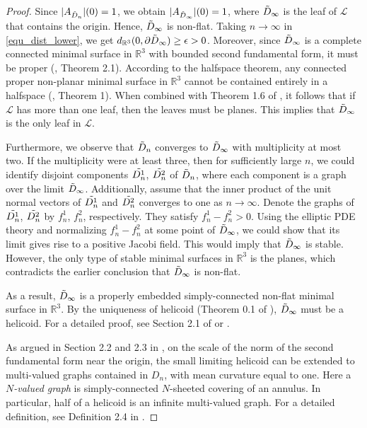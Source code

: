 \documentclass[12pt,a4paper]{amsart}
\numberwithin{equation}{section}
\theoremstyle{plain}
\theoremstyle{named}
\theoremstyle{definition}
\begin{document}
\begin{proof}
    Since $|A_{\Tilde{D}_n}|(0)=1$, we obtain $|A_{\Tilde{D}_\infty}|(0)=1$, where $\Tilde{D}_\infty$ is the leaf of $\mathcal{L}$ that contains the origin. Hence, $\Tilde{D}_\infty$ is non-flat. Taking $n\to\infty$ in \eqref{equ_dist_lower}, we get $d_{\mathbb{R}^3}(0,\partial\Tilde{D}_\infty)\geq \epsilon>0$.
    Moreover, since $\Tilde{D}_\infty$ is a complete connected minimal surface in $\mathbb{R}^3$ with bounded second fundamental form, it must be proper (\cite{Meeks-Rosenberg_properness}, Theorem 2.1).
    According to the halfspace theorem, any connected proper non-planar minimal surface in $\mathbb{R}^3$ cannot be contained entirely in a halfspace (\cite{Hoffman-Meeks}, Theorem 1). When combined with Theorem 1.6 of \cite{Meeks-Rosenberg}, it follows that if $\mathcal{L}$ has more than one leaf, then the leaves must be planes. This implies that $\Tilde{D}_\infty$ is the only leaf in $\mathcal{L}$. 
    
    Furthermore, we observe that $\Tilde{D}_n$ converges to $\Tilde{D}_\infty$ with multiplicity at most two. If the multiplicity were at least three, then for sufficiently large $n$, we could identify disjoint components $\Tilde{D_n^1}$, $\Tilde{D_n^2}$ of $\Tilde{D}_n$, where each component is a graph over the limit $\Tilde{D}_\infty$. Additionally, assume that the inner product of the unit normal vectors of $\Tilde{D_n^1}$ and $\Tilde{D_n^2}$ converges to one as $n\rightarrow \infty$. Denote the graphs of $\Tilde{D_n^1}$, $\Tilde{D_n^2}$ by $f_n^1$, $f_n^2$, respectively. They satisfy $f_n^1-f_n^2>0$. Using the elliptic PDE theory and normalizing $f_n^1-f_n^2$ at some point of $\Tilde{D}_\infty$, we could show that its limit gives rise to a positive Jacobi field. This would imply that $\Tilde{D}_\infty$ is stable. However, the only type of stable minimal surfaces in $\mathbb{R}^3$ is the planes, which contradicts the earlier conclusion that $\Tilde{D}_\infty$ is non-flat. 

    As a result, $\Tilde{D}_\infty$ is a properly embedded simply-connected non-flat minimal surface in $\mathbb{R}^3$. By the uniqueness of helicoid (Theorem 0.1 of \cite{Meeks-Rosenberg}), $\Tilde{D}_\infty$ must be a helicoid. For a detailed proof, see Section 2.1 of \cite{Meeks-Tinaglia_curv_est} or \cite{Meeks-Tinaglia_limit_lamination}.

    As argued in Section 2.2 and 2.3 in \cite{Meeks-Tinaglia_curv_est}, on the scale of the norm of the second fundamental form near the origin, the small limiting helicoid can be extended to multi-valued graphs contained in $D_n$, with mean curvature equal to one.
    Here a \emph{$N$-valued graph} is simply-connected $N$-sheeted covering of an annulus. In particular, half of a helicoid is an infinite multi-valued graph. For a detailed definition, see Definition 2.4 in \cite{Meeks-Tinaglia_curv_est}.
    

\end{proof}
\end{document}
